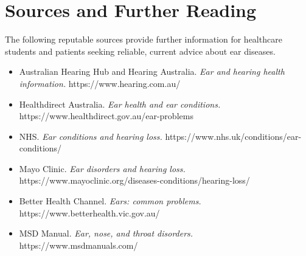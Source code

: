 \section*{Sources and Further Reading}
The following reputable sources provide further information for healthcare students and patients seeking reliable, current advice about ear diseases.
\begin{itemize}
    \item Australian Hearing Hub and Hearing Australia. \textit{Ear and hearing health information.} https://www.hearing.com.au/
    \item Healthdirect Australia. \textit{Ear health and ear conditions.} https://www.healthdirect.gov.au/ear-problems
    \item NHS. \textit{Ear conditions and hearing loss.} https://www.nhs.uk/conditions/ear-conditions/
    \item Mayo Clinic. \textit{Ear disorders and hearing loss.} https://www.mayoclinic.org/diseases-conditions/hearing-loss/
    \item Better Health Channel. \textit{Ears: common problems.} https://www.betterhealth.vic.gov.au/
    \item MSD Manual. \textit{Ear, nose, and throat disorders.} https://www.msdmanuals.com/
\end{itemize}
